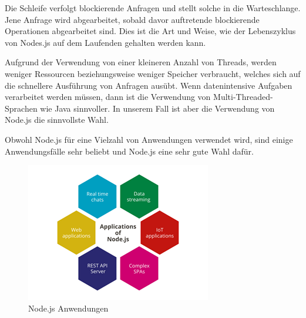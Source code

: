 Die Schleife verfolgt blockierende Anfragen und stellt solche in die Warteschlange. Jene Anfrage wird abgearbeitet, sobald davor auftretende blockierende Operationen abgearbeitet sind. Dies ist die Art und Weise, wie der Lebenszyklus von Nodes.js auf dem Laufenden gehalten werden kann.

Aufgrund der Verwendung von einer kleineren Anzahl von Threads, werden weniger Ressourcen beziehungsweise weniger Speicher verbraucht, welches sich auf die schnellere Ausführung von Anfragen ausübt. Wenn datenintensive Aufgaben verarbeitet werden müssen, dann ist die Verwendung von Multi-Threaded-Sprachen wie Java sinnvoller. In unserem Fall ist aber die Verwendung von Node.js die sinnvollste Wahl. \cite{Arocom}


Obwohl Node.js für eine Vielzahl von Anwendungen verwendet wird, sind einige Anwendungsfälle sehr beliebt und Node.js eine sehr gute Wahl dafür.

\begin{figure}[H]
    \centering
    \includegraphics{media/NodeJs/NodeJsAnwendungen.png}
    \caption{Node.js Anwendungen \cite{AnwendungenFoto}}
\end{figure}

